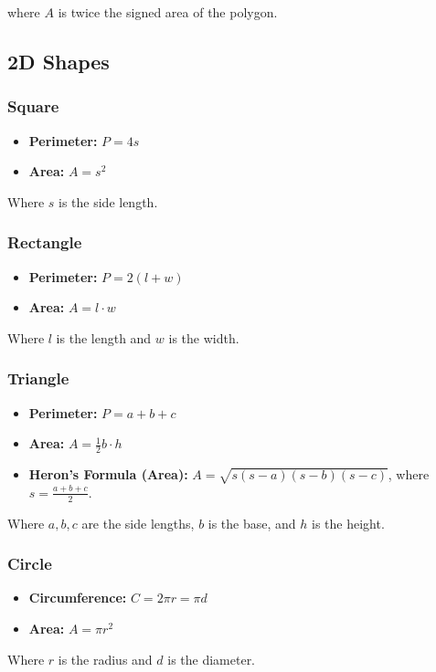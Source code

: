 where $A$ is twice the signed area of the polygon.

\subsection{2D Shapes}

\subsubsection{Square}
\begin{itemize}
    \item \textbf{Perimeter:} $P = 4s$
    \item \textbf{Area:} $A = s^2$
\end{itemize}
Where $s$ is the side length.

\subsubsection{Rectangle}
\begin{itemize}
    \item \textbf{Perimeter:} $P = 2(l + w)$
    \item \textbf{Area:} $A = l \cdot w$
\end{itemize}
Where $l$ is the length and $w$ is the width.

\subsubsection{Triangle}
\begin{itemize}
    \item \textbf{Perimeter:} $P = a + b + c$
    \item \textbf{Area:} $A = \frac{1}{2} b \cdot h$
    \item \textbf{Heron's Formula (Area):} $A = \sqrt{s(s-a)(s-b)(s-c)}$, where $s = \frac{a+b+c}{2}$.
\end{itemize}
Where $a, b, c$ are the side lengths, $b$ is the base, and $h$ is the height.

\subsubsection{Circle}
\begin{itemize}
    \item \textbf{Circumference:} $C = 2\pi r = \pi d$
    \item \textbf{Area:} $A = \pi r^2$
\end{itemize}
Where $r$ is the radius and $d$ is the diameter.

